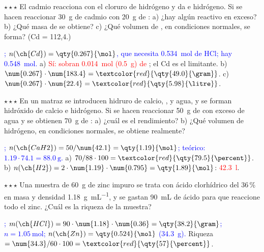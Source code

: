 \begin{exercise}
    \(\star\star\star\) El cadmio reacciona con el cloruro de hidrógeno y da  e hidrógeno. Si se hacen reaccionar
    \qty{30}{\gram} de cadmio con \qty{20}{\gram} de : a) ¿hay algún reactivo en exceso? b) ¿Qué masa de  se
    obtiene? c) ¿Qué volumen de , en condiciones normales, se forma? (Cd = 112,4.)
    \begin{solu}
        \textcolor{blue}{; \(n(\ch{Cd}) = \qty{0.267}{\mol}\), que necesita \qty{0.534}{\mol} de HCl;
        hay \qty{0.548}{\mol}.} a) \textcolor{red}{Sí: sobran \qty{0.014}{\mol} (\qty{0.5}{\gram}) de }; el Cd es el limitante.
        b) \(\num{0.267} \cdot \num{183.4} = \textcolor{red}{\qty{49.0}{\gram}}\). c) \(\num{0.267} \cdot \num{22.4} =
        \textcolor{red}{\qty{5.98}{\litre}}\).
    \end{solu}
\end{exercise}

\begin{exercise}
    \(\star\star\star\) En un matraz se introducen hidruro de calcio, , y agua, y se forman hidróxido de calcio e
    hidrógeno. Si se hacen reaccionar \qty{50}{\gram} de  con exceso de agua y se obtienen \qty{70}{\gram} de
    : a) ¿cuál es el rendimiento? b) ¿Qué volumen de hidrógeno, en condiciones normales, se obtiene realmente?
    \begin{solu}
        \textcolor{blue}{; \(n(\ch{CaH2}) = 50/\num{42.1} = \qty{1.19}{\mol}\); teórico:
        \(\num{1.19} \cdot \num{74.1} = \qty{88.0}{\gram}\).} a) \(70/88 \cdot 100 = \textcolor{red}{\qty{79.5}{\percent}}\).
        b) \(n(\ch{H2}) = 2 \cdot \num{1.19} \cdot \num{0.795} = \qty{1.89}{\mol}\): \textcolor{red}{\qty{42.3}{\litre}}.
    \end{solu}
\end{exercise}

\begin{exercise}
    \(\star\star\star\) Una muestra de \qty{60}{\gram} de zinc impuro se trata con ácido clorhídrico del 36\,\% en masa y densidad
    \qty{1.18}{\gram\per\mL}, y se gastan \qty{90}{\mL} de ácido para que reaccione todo el zinc. ¿Cuál es la riqueza de la
    muestra?
    \begin{solu}
        \textcolor{blue}{; \(m(\ch{HCl}) = 90 \cdot \num{1.18} \cdot \num{0.36} = \qty{38.2}{\gram}\);
        \(n = \qty{1.05}{\mol}\); \(n(\ch{Zn}) = \qty{0.524}{\mol}\) (\qty{34.3}{\gram}).} Riqueza \(= \num{34.3}/60 \cdot 100 =
        \textcolor{red}{\qty{57}{\percent}}\).
    \end{solu}
\end{exercise}

